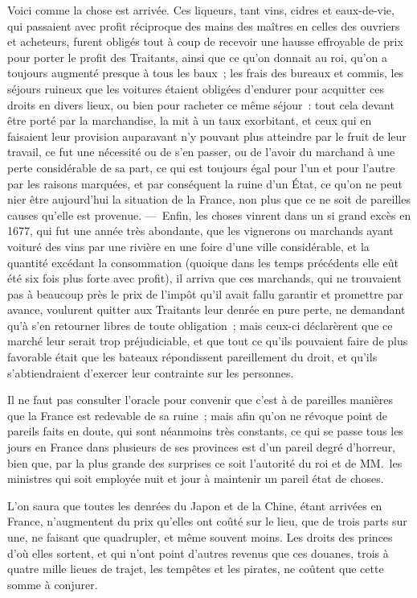 \documentclass[french,twoside]{book} %
\begin{document}
Voici comme la chose est arrivée. Ces liqueurs, tant vins, cidres et eaux-de-vie, qui passaient avec profit réciproque des mains des maîtres en celles des ouvriers et acheteurs, furent obligés tout à coup de recevoir une hausse effroyable de prix pour porter le profit des Traitants, ainsi que ce qu’on donnait au roi, qu’on a toujours augmenté presque à tous les baux ; les frais des bureaux et commis, les séjours ruineux que les voitures étaient obligées d’endurer pour acquitter ces droits en divers lieux, ou bien pour racheter ce même séjour : tout cela devant être porté par la marchandise, la mit à un taux exorbitant, et ceux qui en faisaient leur provision auparavant n’y pouvant plus atteindre par le fruit de leur travail, ce fut une nécessité ou de s’en passer, ou de l’avoir du marchand à une perte considérable de sa part, ce qui est toujours égal pour l’un et pour l’autre par les raisons marquées, et par conséquent la ruine d’un État, ce qu’on ne peut nier être aujourd’hui la situation de la France, non plus que ce ne soit de pareilles causes qu’elle est provenue. — Enfin, les choses vinrent dans un si grand excès en 1677, qui fut une année très abondante, que les vignerons ou marchands ayant voituré des vins par une rivière en une foire d’une ville considérable, et la quantité excédant la consommation (quoique dans les temps précédents elle eût été six fois plus forte avec profit), il arriva que ces marchands, qui ne trouvaient pas à beaucoup près le prix de l’impôt qu’il avait fallu garantir et promettre par avance, voulurent quitter aux Traitants leur denrée en pure perte, ne demandant qu’à s’en retourner libres de toute obligation ; mais ceux-ci déclarèrent que ce marché leur serait trop préjudiciable, et que tout ce qu’ils pouvaient faire de plus favorable était que les bateaux répondissent pareillement du droit, et qu’ils s’abtiendraient d’exercer leur contrainte sur les personnes.\par
Il ne faut pas consulter l’oracle pour convenir que c’est à de pareilles manières que la France est redevable de sa ruine ; mais afin qu’on ne révoque point de pareils faits en doute, qui sont néanmoins très constants, ce qui se passe tous les jours en France dans plusieurs de ses provinces est d’un pareil degré d’horreur, bien que, par la plus grande des surprises ce soit l’autorité du roi et de MM. les ministres qui soit employée nuit et jour à maintenir un pareil état de choses.\par
L’on saura que toutes les denrées du Japon et de la Chine, étant arrivées en France, n’augmentent du prix qu’elles ont coûté sur le lieu, que de trois parts sur une, ne faisant que quadrupler, et même souvent moins. Les droits des princes d’où elles sortent, et qui n’ont point d’autres revenus que ces douanes, trois à quatre mille lieues de trajet, les tempêtes et les pirates, ne coûtent que cette somme à conjurer.\par
\end{document}
